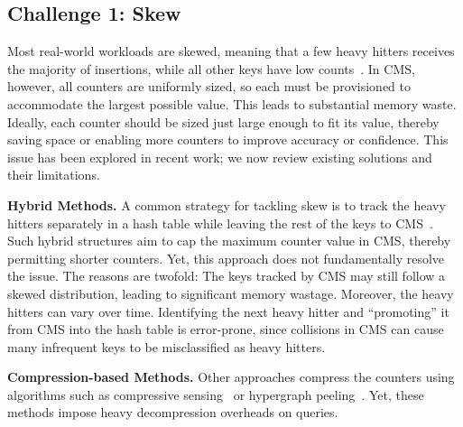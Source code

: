 \documentclass[sigconf]{acmart}
\begin{document}
\subsection{Challenge 1: Skew}\label{sec:problem_analysis_skew}
Most real-world workloads are skewed, meaning that a few heavy hitters receives
the majority of insertions, while all other keys have low
counts~\cite{Memento,AdditiveErrorCounters,StingySketch}. In CMS, however, all
counters are uniformly sized, so each must be provisioned to accommodate the
largest possible value. This leads to substantial memory waste. Ideally, each
counter should be sized just large enough to fit its value, thereby saving
space or enabling more counters to improve accuracy or confidence. This issue
has been explored in recent work; we now review existing solutions and their
limitations.

\textbf{Hybrid Methods.}
A common strategy for tackling skew is to track the heavy
hitters separately in a hash table while leaving the rest of the keys to
CMS~\cite{AugmentedSketch,HeavyKeeper,HeavyGuardian,MVSketch,WavingSketch,ElasticSketch}.
Such hybrid structures aim to cap the maximum counter value in CMS, thereby
permitting shorter counters. Yet, this approach does not fundamentally resolve
the issue. The reasons are twofold: The keys tracked by CMS may still follow a
skewed distribution, leading to significant memory wastage. Moreover, the heavy
hitters can vary over time. Identifying the next heavy hitter and ``promoting''
it from CMS into the hash table is error-prone, since collisions in CMS can
cause many infrequent keys to be misclassified as heavy hitters.

\textbf{Compression-based Methods.}
Other approaches compress the counters using algorithms such as compressive
sensing~\cite{TreeSensing,BitSense} or hypergraph peeling~\cite{CodingSketch}.
Yet, these methods impose heavy decompression overheads on queries.
\end{document}
